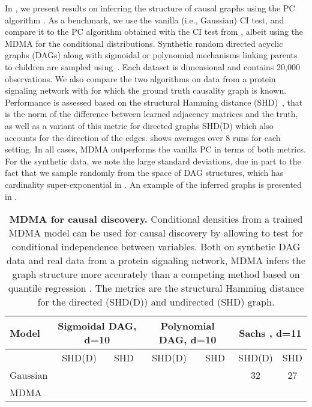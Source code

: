 \documentclass{article}
\begin{document}
In , we present results on inferring the structure of causal graphs using the PC algorithm \cite{Spirtes2000,kalisch2007estimating,sun2007kernel,tillman2009nonlinear,harris2013pc}.
As a benchmark, we use the vanilla (i.e., Gaussian) CI test, and compare it to the PC algorithm obtained with the CI test from \citep{petersen2021testing}, albeit using the MDMA for the conditional distributions.
Synthetic random directed acyclic graphs (DAGs) along with sigmoidal or polynomial mechanisms linking parents to children are sampled using~\cite{JMLR:v21:19-187}.
Each dataset is  dimensional and contains 20,000 observations.
We also compare the two algorithms on data from a protein signaling network with  \cite{sachs2005causal} for which the ground truth causality graph is known.
Performance is assessed based on the structural Hamming distance (SHD)~\cite{Tsamardinos2006}, that is the  norm of the difference between learned adjacency matrices and the truth, as well as a variant of this metric for directed graphs SHD(D) which also accounts for the direction of the edges.
 shows averages over 8 runs for each setting.
In all cases, MDMA outperforms the vanilla PC in terms of both metrics.
For the synthetic data, we note the large standard deviations, due in part to the fact that we sample randomly from the space of DAG structures, which has cardinality super-exponential in .
An example of the inferred graphs is presented in .

\begin{table}[]
\caption{\textbf{MDMA for causal discovery.} Conditional densities from a trained MDMA model can be used for causal discovery by allowing to test for conditional independence between variables. Both on synthetic DAG data and real data from a protein signaling network, MDMA infers the graph structure more accurately than a competing method based on quantile regression \cite{petersen2021testing}. The metrics are the structural Hamming distance for the directed (SHD(D)) and undirected (SHD) graph. \label{tab:CD} }
\begin{tabular}{lcccccc}
\toprule
Model & \multicolumn{2}{c}{Sigmoidal DAG, d=10} &  \multicolumn{2}{c}{Polynomial DAG, d=10} & \multicolumn{2}{c}{Sachs \cite{sachs2005causal}, d=11} 
\\ \hline
      & SHD(D)                  & SHD              & SHD(D)                    & SHD                & SHD(D)            & SHD        \\
Gaussian    &         &        &          &          & 32             & 27             \\
MDMA        &         &        &          &          &  & 
\\
\bottomrule
\end{tabular}
\end{table}
\end{document}
